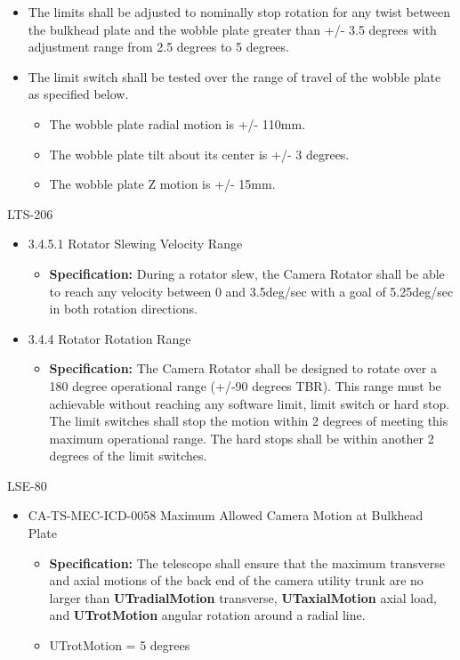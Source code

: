 \documentclass[SE,lsstdraft,authoryear,toc]{lsstdoc}
\begin{document}
\begin{itemize}
\item
  The limits shall be adjusted to nominally stop rotation for any twist
  between the bulkhead plate and the wobble plate greater than +/- 3.5
  degrees with adjustment range from 2.5 degrees to 5 degrees.
\item
  The limit switch shall be tested over the range of travel of the
  wobble plate as specified below.

  \begin{itemize}
  \item
    The wobble plate radial motion is +/- 110mm.
  \item
    The wobble plate tilt about its center is +/- 3 degrees.
  \item
    The wobble plate Z motion is +/- 15mm.
  \end{itemize}
\end{itemize}

LTS-206

\begin{itemize}
\item
  3.4.5.1 Rotator Slewing Velocity Range

  \begin{itemize}
  \item
    \textbf{Specification:} During a rotator slew, the Camera Rotator
    shall be able to reach any velocity between 0 and 3.5deg/sec with a
    goal of 5.25deg/sec in both rotation directions.
  \end{itemize}
\item
  3.4.4 Rotator Rotation Range

  \begin{itemize}
  \item
    \textbf{Specification:} The Camera Rotator shall be designed to
    rotate over a 180 degree operational range (+/-90 degrees TBR). This
    range must be achievable without reaching any software limit, limit
    switch or hard stop. The limit switches shall stop the motion within
    2 degrees of meeting this maximum operational range. The hard stops
    shall be within another 2 degrees of the limit switches.
  \end{itemize}
\end{itemize}

LSE-80

\begin{itemize}
\item
  CA-TS-MEC-ICD-0058 Maximum Allowed Camera Motion at Bulkhead Plate

  \begin{itemize}
  \item
    \textbf{Specification:} The telescope shall ensure that the maximum
    transverse and axial motions of the back end of the camera utility
    trunk are no larger than \textbf{UTradialMotion} transverse,
    \textbf{UTaxialMotion} axial load, and \textbf{UTrotMotion} angular
    rotation around a radial line.
  \item
    UTrotMotion = 5 degrees
  \end{itemize}
\end{itemize}
\end{document}
